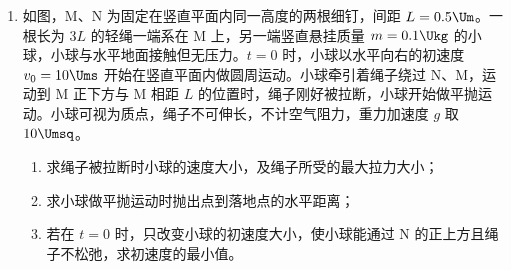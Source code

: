 \documentclass[\gkver]{gaokaozhenti}
\begin{document}
\begin{enumerate}
{要使激光能在圆心 $O$ 点发生全反射，激光必须指向 $O$ 点射入，如图所示。只要入射角大于 $45^{\circ}$，即可发生全反射，则使激光能在圆心 $O$ 点发生全反射，入射光线与 $x$ 轴之间夹角的范围 $(0, 45^{\circ}]$。由对称性可知，入射光线与 $x$ 轴之间夹角的范围还可以为 $[135^{\circ}, 180^{\circ})$。
}

\item
如图，M、N 为固定在竖直平面内同一高度的两根细钉，间距 $L = 0.5 \Um$。一根长为 $3L$ 的轻绳一端系在 M 上，另一端竖直悬挂质量 $m = 0.1 \Ukg$ 的小球，小球与水平地面接触但无压力。$t = 0$ 时，小球以水平向右的初速度 $v_{0} = 10 \Ums$ 开始在竖直平面内做圆周运动。小球牵引着绳子绕过 N、M，运动到 M 正下方与 M 相距 $L$ 的位置时，绳子刚好被拉断，小球开始做平抛运动。小球可视为质点，绳子不可伸长，不计空气阻力，重力加速度 $g$ 取 $10 \Umsq$。
\begin{enumerate}
\item
求绳子被拉断时小球的速度大小，及绳子所受的最大拉力大小；
\item
求小球做平抛运动时抛出点到落地点的水平距离；
\item
若在 $t = 0$ 时，只改变小球的初速度大小，使小球能通过 N 的正上方且绳子不松弛，求初速度的最小值。
\end{enumerate}

\onepicture[w=5.50cm, align=right]{}

\end{enumerate}
\end{document}
